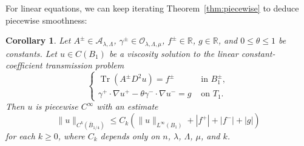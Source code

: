 \documentclass[letter,11pt]{amsart}
\newcommand{\R}{\mathbb{R}}
\newcommand{\tr}[1]{\operatorname{Tr}(#1)}
\newcommand{\ellmat}{\mathcal{A}_{\lambda, \Lambda}}
\newcommand{\ellvec}{\mathcal{O}_{\lambda,\Lambda,\mu}}
\newtheorem{cor}[thm]{Corollary}
\theoremstyle{definition}
\numberwithin{equation}{section}
\begin{document}
\medskip

For linear equations, we can keep iterating Theorem~\ref{thm:piecewise} to deduce piecewise smoothness:

\begin{cor}
Let $A^{\pm} \in \ellmat$, $\gamma^{\pm} \in \ellvec$, $f^{\pm} \in \R$, $g \in \R$, and $0 \leq \theta \leq 1$ be constants.
Let $u \in C(B_1)$ be a viscosity solution to the linear constant-coefficient transmission problem
\[
\begin{cases}
\tr{A^{\pm} D^2 u} = f^{\pm} & \text{ in } B_1^{\pm},\\
\gamma^{+} \cdot \nabla u^{+}  - \theta \gamma^{-} \cdot \nabla u^{-} = g
 & \text{ on } T_1.
\end{cases}
\]
Then $u$ is piecewise $C^{\infty}$ with an estimate
\[
\|u\|_{C^k(\overline{B}_{1/4})} \leq C_k \left(\|u\|_{L^{\infty}(B_1)} + |f^{+}| +|f^{-}| + |g| \right)
\]
for each $k \geq 0$, where $C_k$ depends only on $n$, $\lambda$, $\Lambda$, $\mu$, and $k$.
\end{cor}
\end{document}
